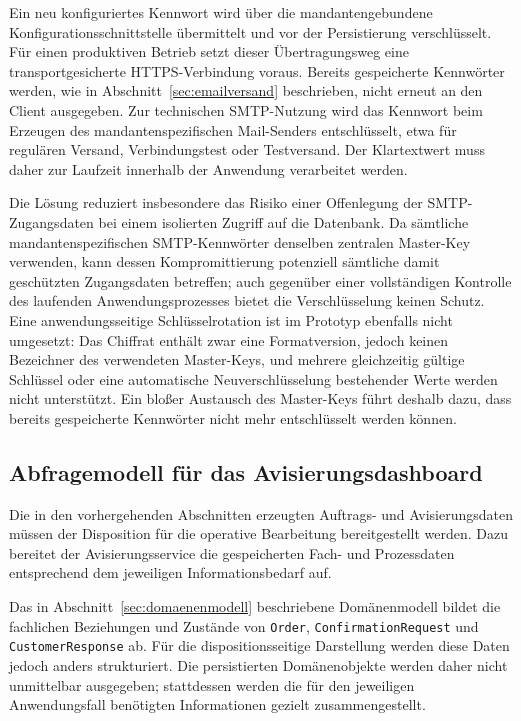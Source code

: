 Ein neu konfiguriertes Kennwort wird über die mandantengebundene
Konfigurationsschnittstelle übermittelt und vor der Persistierung
verschlüsselt. Für einen produktiven Betrieb setzt dieser Übertragungsweg eine
transportgesicherte HTTPS-Verbindung voraus. Bereits gespeicherte Kennwörter
werden, wie in Abschnitt~\ref{sec:emailversand} beschrieben, nicht erneut an
den Client ausgegeben. Zur technischen SMTP-Nutzung wird das Kennwort beim
Erzeugen des mandantenspezifischen Mail-Senders entschlüsselt, etwa für
regulären Versand, Verbindungstest oder Testversand. Der Klartextwert muss
daher zur Laufzeit innerhalb der Anwendung verarbeitet werden.

Die Lösung reduziert insbesondere das Risiko einer Offenlegung der
SMTP-Zugangsdaten bei einem isolierten Zugriff auf die Datenbank. Da sämtliche
mandantenspezifischen SMTP-Kennwörter denselben zentralen Master-Key verwenden,
kann dessen Kompromittierung potenziell sämtliche damit geschützten
Zugangsdaten betreffen; auch gegenüber einer vollständigen Kontrolle des
laufenden Anwendungsprozesses bietet die Verschlüsselung keinen Schutz. Eine
anwendungsseitige Schlüsselrotation ist im Prototyp ebenfalls nicht umgesetzt:
Das Chiffrat enthält zwar eine Formatversion, jedoch keinen Bezeichner des
verwendeten Master-Keys, und mehrere gleichzeitig gültige Schlüssel oder eine
automatische Neuverschlüsselung bestehender Werte werden nicht unterstützt.
Ein bloßer Austausch des Master-Keys führt deshalb dazu, dass bereits
gespeicherte Kennwörter nicht mehr entschlüsselt werden können.

\subsection{Abfragemodell für das Avisierungsdashboard}
\label{sec:abfragemodell}

Die in den vorhergehenden Abschnitten erzeugten Auftrags- und
Avisierungsdaten müssen der Disposition für die operative Bearbeitung
bereitgestellt werden. Dazu bereitet der Avisierungsservice die gespeicherten
Fach- und Prozessdaten entsprechend dem jeweiligen Informationsbedarf auf.

Das in Abschnitt~\ref{sec:domaenenmodell} beschriebene
Domänenmodell bildet die fachlichen Beziehungen und Zustände von
\texttt{Order}, \texttt{ConfirmationRequest} und \texttt{CustomerResponse}
ab. Für die dispositionsseitige Darstellung werden diese Daten jedoch anders
strukturiert. Die persistierten Domänenobjekte werden daher nicht unmittelbar
ausgegeben; stattdessen werden die für den jeweiligen Anwendungsfall
benötigten Informationen gezielt zusammengestellt.

